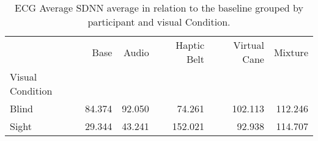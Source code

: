 
\begin{table}[!htb]
\centering
\caption{ECG Average SDNN average in relation to the baseline grouped by participant and visual Condition.}
\label{tab:ecg_sdnn_average_group}
\begin{tabular}{lrrrrr}
\toprule
{} &   Base &  Audio &  Haptic Belt &  Virtual Cane &  Mixture \\
Visual Condition &        &        &              &               &          \\
\midrule
Blind            & 84.374 & 92.050 &       74.261 &       102.113 &  112.246 \\
Sight            & 29.344 & 43.241 &      152.021 &        92.938 &  114.707 \\
\bottomrule
\end{tabular}
\end{table}

